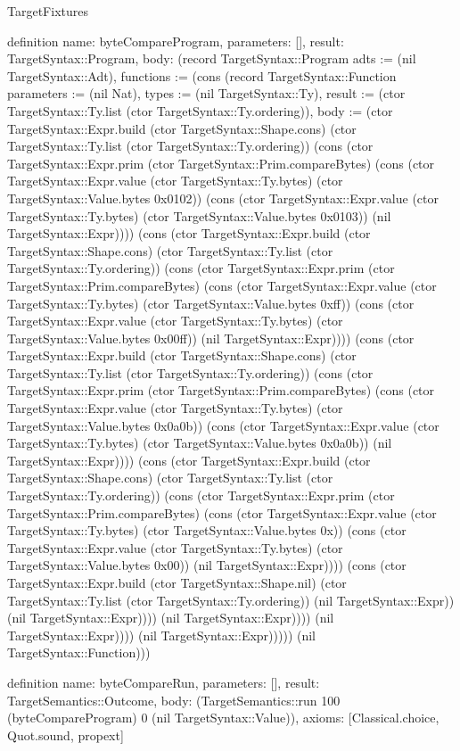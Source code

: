 \begin{lexlean}{TargetFixtures}
\begin{semanticmodule}
definition{
  name: byteCompareProgram,
  parameters: [],
  result: TargetSyntax::Program,
  body: (record TargetSyntax::Program {adts := (nil TargetSyntax::Adt), functions := (cons (record TargetSyntax::Function {parameters := (nil Nat), types := (nil TargetSyntax::Ty), result := (ctor TargetSyntax::Ty.list (ctor TargetSyntax::Ty.ordering)), body := (ctor TargetSyntax::Expr.build (ctor TargetSyntax::Shape.cons) (ctor TargetSyntax::Ty.list (ctor TargetSyntax::Ty.ordering)) (cons (ctor TargetSyntax::Expr.prim (ctor TargetSyntax::Prim.compareBytes) (cons (ctor TargetSyntax::Expr.value (ctor TargetSyntax::Ty.bytes) (ctor TargetSyntax::Value.bytes 0x0102)) (cons (ctor TargetSyntax::Expr.value (ctor TargetSyntax::Ty.bytes) (ctor TargetSyntax::Value.bytes 0x0103)) (nil TargetSyntax::Expr)))) (cons (ctor TargetSyntax::Expr.build (ctor TargetSyntax::Shape.cons) (ctor TargetSyntax::Ty.list (ctor TargetSyntax::Ty.ordering)) (cons (ctor TargetSyntax::Expr.prim (ctor TargetSyntax::Prim.compareBytes) (cons (ctor TargetSyntax::Expr.value (ctor TargetSyntax::Ty.bytes) (ctor TargetSyntax::Value.bytes 0xff)) (cons (ctor TargetSyntax::Expr.value (ctor TargetSyntax::Ty.bytes) (ctor TargetSyntax::Value.bytes 0x00ff)) (nil TargetSyntax::Expr)))) (cons (ctor TargetSyntax::Expr.build (ctor TargetSyntax::Shape.cons) (ctor TargetSyntax::Ty.list (ctor TargetSyntax::Ty.ordering)) (cons (ctor TargetSyntax::Expr.prim (ctor TargetSyntax::Prim.compareBytes) (cons (ctor TargetSyntax::Expr.value (ctor TargetSyntax::Ty.bytes) (ctor TargetSyntax::Value.bytes 0x0a0b)) (cons (ctor TargetSyntax::Expr.value (ctor TargetSyntax::Ty.bytes) (ctor TargetSyntax::Value.bytes 0x0a0b)) (nil TargetSyntax::Expr)))) (cons (ctor TargetSyntax::Expr.build (ctor TargetSyntax::Shape.cons) (ctor TargetSyntax::Ty.list (ctor TargetSyntax::Ty.ordering)) (cons (ctor TargetSyntax::Expr.prim (ctor TargetSyntax::Prim.compareBytes) (cons (ctor TargetSyntax::Expr.value (ctor TargetSyntax::Ty.bytes) (ctor TargetSyntax::Value.bytes 0x)) (cons (ctor TargetSyntax::Expr.value (ctor TargetSyntax::Ty.bytes) (ctor TargetSyntax::Value.bytes 0x00)) (nil TargetSyntax::Expr)))) (cons (ctor TargetSyntax::Expr.build (ctor TargetSyntax::Shape.nil) (ctor TargetSyntax::Ty.list (ctor TargetSyntax::Ty.ordering)) (nil TargetSyntax::Expr)) (nil TargetSyntax::Expr)))) (nil TargetSyntax::Expr)))) (nil TargetSyntax::Expr)))) (nil TargetSyntax::Expr))))}) (nil TargetSyntax::Function))})
}

definition{
  name: byteCompareRun,
  parameters: [],
  result: TargetSemantics::Outcome,
  body: (TargetSemantics::run 100 (byteCompareProgram) 0 (nil TargetSyntax::Value)),
  axioms: [Classical.choice, Quot.sound, propext]
}


\end{semanticmodule}
\end{lexlean}
